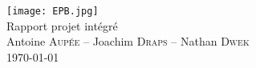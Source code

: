 \begin{titlepage}
\centering

\vspace*{\fill}

\texttt{[image: EPB.jpg]}~\\[0.75cm]
{\Large Rapport projet intégré}\\[0.3cm]

{\large Antoine \textsc{Aupée} -- Joachim \textsc{Draps} -- Nathan \textsc{Dwek}}\\[0.5cm]

{\small \today}
\vspace{5cm}

\vspace*{\fill}

\end{titlepage}